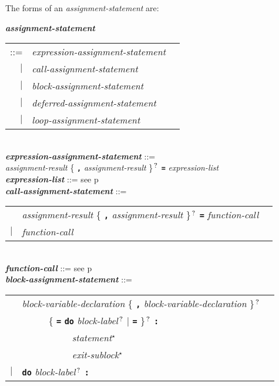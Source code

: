 \documentclass[12pt]{article}
\newcommand{\TT}[1]{{\tt \bfseries #1}}
\newcommand{\STAR}{{\Large $^\star$}}
\newcommand{\QMARK}{{$^{\,\mbox{\footnotesize ?}}$}}
\newcommand{\ttkey}[1]{{\tt \bfseries #1}}
\newcommand{\emkey}[1]{{\em \bfseries #1}}
\newcommand{\pagref}[1]{p\pageref{#1}}
\newenvironment{indpar}[1][0.3in]%
	{\begin{list}{}%
		     {\setlength{\itemsep}{0in}%
		      \setlength{\topsep}{0in}%
		      \setlength{\parsep}{1ex}%
		      \setlength{\labelwidth}{#1}%
		      \setlength{\leftmargin}{#1}%
		      \addtolength{\leftmargin}{\labelsep}}%
	 \item}%
	{\end{list}}
\begin{document}
The forms of an {\em assignment-statement} are:
\begin{indpar}
\emkey{assignment-statement}
    \begin{tabular}[t]{@{}rll}
    ::= & {\em expression-assignment-statement} \\
    $|$ & {\em call-assignment-statement} \\
    $|$ & {\em block-assignment-statement} \\
    $|$ & {\em deferred-assignment-statement} \\
    $|$ & {\em loop-assignment-statement} \\
    \end{tabular}
\\[0.5ex]
\emkey{expression-assignment-statement} ::= \\
\hspace*{0.5in} {\em assignment-result}
                \{ \TT{,} {\em assignment-result} \}\QMARK{}
		\TT{=} {\em expression-list}
\\[0.5ex]
\emkey{expression-list} ::= see \pagref{EXPRESSION-LIST}
\\[0.5ex]
\emkey{call-assignment-statement} ::= \\
\hspace*{0.5in}
    \begin{tabular}[t]{@{}rll}
        & {\em assignment-result}
                \{ \TT{,} {\em assignment-result} \}\QMARK{}
		\TT{=} {\em function-call} \\
    $|$ & {\em function-call} \\
    \end{tabular}
\\[0.5ex]
\emkey{function-call} ::= see \pagref{FUNCTION-CALLS}
\\[0.5ex]
\emkey{block-assignment-statement} ::= \\
\hspace*{0.5in}
    \begin{tabular}[t]{@{}rll}
        & {\em block-variable-declaration}
                \{ \TT{,} {\em block-variable-declaration} \}\QMARK{} \\
	& ~~~~~ \{ \TT{=}
	           \ttkey{do} {\em block-label}\QMARK{} $|$ \TT{=} \}\QMARK{}
		   \TT{:} \\
        & ~~~~~~~~~~ {\em statement}\STAR{} \\
        & ~~~~~~~~~~ {\em exit-sublock}\STAR{} \\
    $|$ & \ttkey{do} {\em block-label}\QMARK{} \TT{:} \\

\end{tabular}
\end{indpar}
\end{document}
